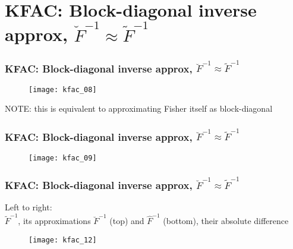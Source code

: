 \section{KFAC: Block-diagonal inverse approx, $\breve{F}^{-1} \approx \tilde{F}^{-1}$}

\begin{frame}
\frametitle{KFAC: Block-diagonal inverse approx, $\breve{F}^{-1} \approx \tilde{F}^{-1}$}
\begin{figure}
    \centering
    \texttt{[image: kfac\_08]}
\end{figure}
NOTE: this is equivalent to approximating Fisher itself as block-diagonal
\end{frame}

\begin{frame}
\frametitle{KFAC: Block-diagonal inverse approx, $\breve{F}^{-1} \approx \tilde{F}^{-1}$}
\begin{figure}
    \centering
    \texttt{[image: kfac\_09]}
\end{figure}
\end{frame}

\begin{frame}
\frametitle{KFAC: Block-diagonal inverse approx, $\breve{F}^{-1} \approx \tilde{F}^{-1}$}
{\footnotesize
Left to right: \\
$\tilde{F}^{-1}$, its approximations $\breve{F}^{-1}$ (top) and $\hat{F}^{-1}$ (bottom), their absolute difference
}
\begin{figure}
    \centering
    \texttt{[image: kfac\_12]}
\end{figure}
\end{frame}



